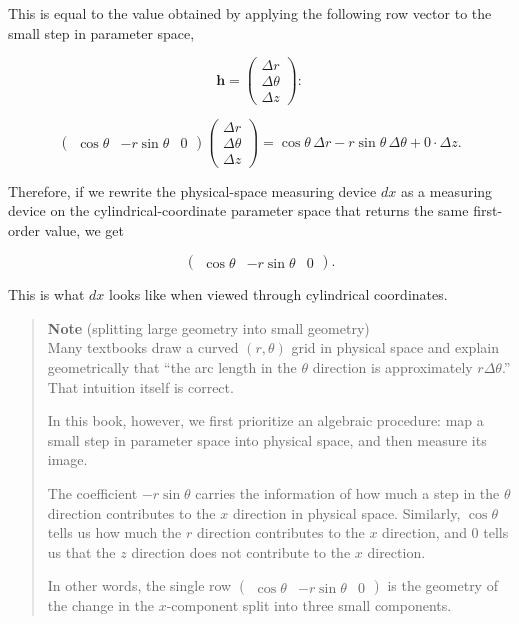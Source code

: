 This is equal to the value obtained by applying the following row vector
to the small step in parameter space,

\[
\mathbf h
=
\begin{pmatrix}
\Delta r\\
\Delta\theta\\
\Delta z
\end{pmatrix}:
\]

\[
\begin{pmatrix}
\cos\theta & -r\sin\theta & 0
\end{pmatrix}
\begin{pmatrix}
\Delta r\\
\Delta\theta\\
\Delta z
\end{pmatrix}
=
\cos\theta\,\Delta r
-r\sin\theta\,\Delta\theta
+0\cdot\Delta z.
\]

Therefore, if we rewrite the physical-space measuring device \(dx\) as a
measuring device on the cylindrical-coordinate parameter space that
returns the same first-order value, we get

\[
\begin{pmatrix}
\cos\theta & -r\sin\theta & 0
\end{pmatrix}.
\]

This is what \(dx\) looks like when viewed through cylindrical
coordinates.

\begin{quote}
\textbf{Note} (splitting large geometry into small geometry)\\
Many textbooks draw a curved \((r,\theta)\) grid in physical space and
explain geometrically that ``the arc length in the \(\theta\) direction
is approximately \(r\Delta\theta\).'' That intuition itself is correct.

In this book, however, we first prioritize an algebraic procedure: map a
small step in parameter space into physical space, and then measure its
image.

The coefficient \(-r\sin\theta\) carries the information of how much a
step in the \(\theta\) direction contributes to the \(x\) direction in
physical space. Similarly, \(\cos\theta\) tells us how much the \(r\)
direction contributes to the \(x\) direction, and \(0\) tells us that
the \(z\) direction does not contribute to the \(x\) direction.

In other words, the single row
\(\begin{pmatrix}\cos\theta & -r\sin\theta & 0\end{pmatrix}\) is the
geometry of the change in the \(x\)-component split into three small
components.
\end{quote}

